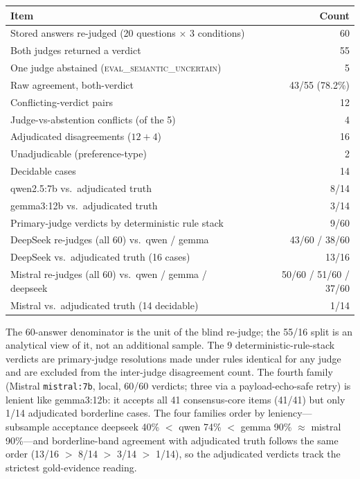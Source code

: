 \documentclass[11pt]{article}
\newcommand{\evaluncertain}{\textsc{eval\_semantic\_uncertain}}
\begin{document}
\begin{center}
\begin{tabular}{lr}
\toprule
Item & Count \\
\midrule
Stored answers re-judged (20 questions $\times$ 3 conditions) & 60 \\
Both judges returned a verdict & 55 \\
One judge abstained (\evaluncertain{}) & 5 \\
Raw agreement, both-verdict & 43/55 (78.2\%) \\
Conflicting-verdict pairs & 12 \\
Judge-vs-abstention conflicts (of the 5) & 4 \\
Adjudicated disagreements ($12 + 4$) & 16 \\
Unadjudicable (preference-type) & 2 \\
Decidable cases & 14 \\
qwen2.5:7b vs.\ adjudicated truth & 8/14 \\
gemma3:12b vs.\ adjudicated truth & 3/14 \\
Primary-judge verdicts by deterministic rule stack & 9/60 \\
DeepSeek re-judges (all 60) vs.\ qwen / gemma & 43/60 / 38/60 \\
DeepSeek vs.\ adjudicated truth (16 cases) & 13/16 \\
Mistral re-judges (all 60) vs.\ qwen / gemma / deepseek & 50/60 / 51/60 / 37/60 \\
Mistral vs.\ adjudicated truth (14 decidable) & 1/14 \\
\bottomrule
\end{tabular}
\end{center}

The 60-answer denominator is the unit of the blind re-judge; the 55/16
split is an analytical view of it, not an additional sample. The 9
deterministic-rule-stack verdicts are primary-judge resolutions made
under rules identical for any judge and are excluded from the
inter-judge disagreement count. The fourth family (Mistral
\texttt{mistral:7b}, local, 60/60 verdicts; three via a payload-echo-safe
retry) is lenient like gemma3:12b: it accepts all 41 consensus-core items
(41/41) but only 1/14 adjudicated borderline cases. The four families
order by leniency---subsample acceptance deepseek 40\% $<$ qwen 74\% $<$
gemma 90\% $\approx$ mistral 90\%---and borderline-band agreement with
adjudicated truth follows the same order (13/16 $>$ 8/14 $>$ 3/14 $>$
1/14), so the adjudicated verdicts track the strictest gold-evidence
reading.
\end{document}
